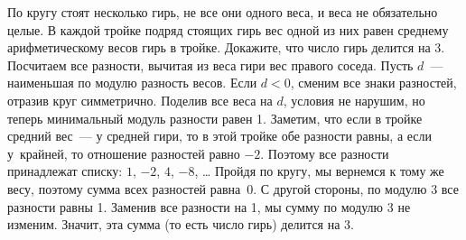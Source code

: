 \problem
По кругу стоят несколько гирь, не все они одного веса, и веса не обязательно
целые.
В каждой тройке подряд стоящих гирь вес одной из них равен среднему
арифметическому весов гирь в тройке.
Докажите, что число гирь делится на 3.
\solution
Посчитаем все разности, вычитая из веса гири вес правого соседа.
Пусть $d$~--- наименьшая по модулю разность весов.
Если $d < 0$, сменим все знаки разностей, отразив круг симметрично.
Поделив все веса на $d$, условия не нарушим, но теперь минимальный модуль
разности равен 1.
Заметим, что если в тройке средний вес~--- у средней гири, то в этой тройке обе
разности равны, а если у~крайней, то отношение разностей равно $-2$.
Поэтому все разности принадлежат списку: $1$, $-2$, $4$, $-8$, \ldots
Пройдя по кругу, мы вернемся к тому же весу, поэтому сумма всех разностей
равна~0.
С другой стороны, по модулю 3 все разности равны 1.
Заменив все разности на 1, мы сумму по модулю 3 не изменим.
Значит, эта сумма (то есть число гирь) делится на 3.
\endproblem
